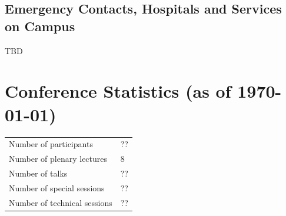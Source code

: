 \subsection{Emergency Contacts, Hospitals and Services on Campus}

TBD



\section{Conference Statistics (as of \today)}

\begin{center}
 \begin{tabular}{ll}
 Number of participants & ?? \\
 Number of plenary lectures & 8 \\
 Number of talks & ?? \\
 Number of special sessions & ?? \\
 Number of technical sessions & ?? \\
 \end{tabular}
\end{center}